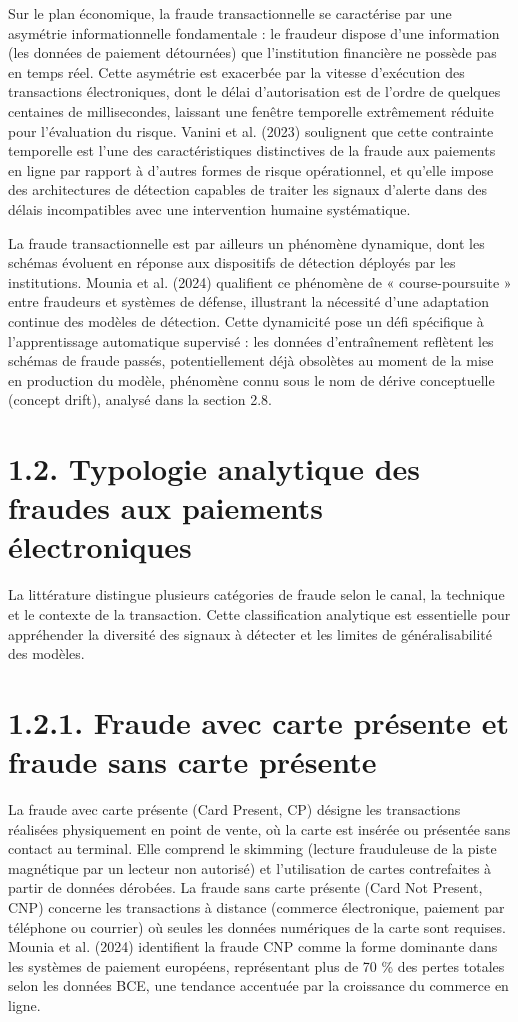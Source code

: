 Sur le plan économique, la fraude transactionnelle se caractérise par une asymétrie informationnelle fondamentale : le fraudeur dispose d'une information (les données de paiement détournées) que l'institution financière ne possède pas en temps réel. Cette asymétrie est exacerbée par la vitesse d'exécution des transactions électroniques, dont le délai d'autorisation est de l'ordre de quelques centaines de millisecondes, laissant une fenêtre temporelle extrêmement réduite pour l'évaluation du risque. Vanini et al. (2023) soulignent que cette contrainte temporelle est l'une des caractéristiques distinctives de la fraude aux paiements en ligne par rapport à d'autres formes de risque opérationnel, et qu'elle impose des architectures de détection capables de traiter les signaux d'alerte dans des délais incompatibles avec une intervention humaine systématique.

La fraude transactionnelle est par ailleurs un phénomène dynamique, dont les schémas évoluent en réponse aux dispositifs de détection déployés par les institutions. Mounia et al. (2024) qualifient ce phénomène de « course-poursuite » entre fraudeurs et systèmes de défense, illustrant la nécessité d'une adaptation continue des modèles de détection. Cette dynamicité pose un défi spécifique à l'apprentissage automatique supervisé : les données d'entraînement reflètent les schémas de fraude passés, potentiellement déjà obsolètes au moment de la mise en production du modèle, phénomène connu sous le nom de dérive conceptuelle (concept drift), analysé dans la section 2.8.

\section{1.2. Typologie analytique des fraudes aux paiements électroniques}

La littérature distingue plusieurs catégories de fraude selon le canal, la technique et le contexte de la transaction. Cette classification analytique est essentielle pour appréhender la diversité des signaux à détecter et les limites de généralisabilité des modèles.

\section{1.2.1. Fraude avec carte présente et fraude sans carte présente}

La fraude avec carte présente (Card Present, CP) désigne les transactions réalisées physiquement en point de vente, où la carte est insérée ou présentée sans contact au terminal. Elle comprend le skimming (lecture frauduleuse de la piste magnétique par un lecteur non autorisé) et l'utilisation de cartes contrefaites à partir de données dérobées. La fraude sans carte présente (Card Not Present, CNP) concerne les transactions à distance (commerce électronique, paiement par téléphone ou courrier) où seules les données numériques de la carte sont requises. Mounia et al. (2024) identifient la fraude CNP comme la forme dominante dans les systèmes de paiement européens, représentant plus de 70 \% des pertes totales selon les données BCE, une tendance accentuée par la croissance du commerce en ligne.


